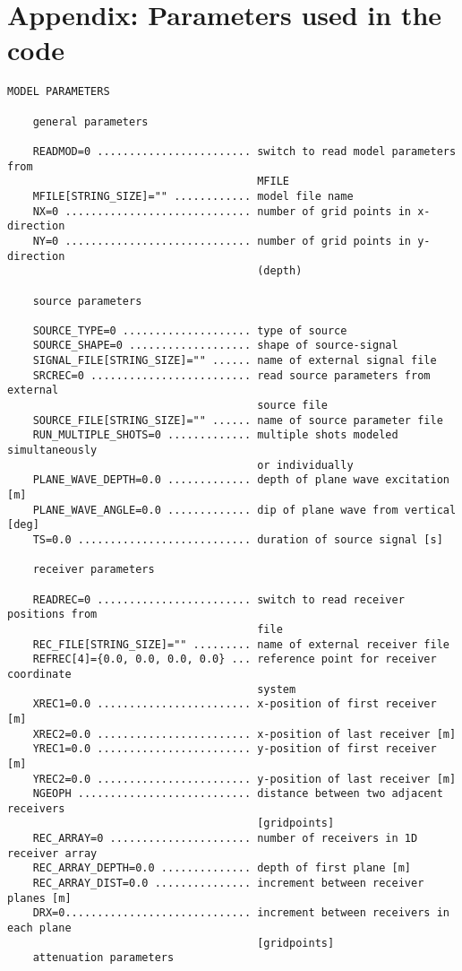 \section{Appendix: Parameters used in the code}
\label{parameters}

\begin{verbatim}
MODEL PARAMETERS
    
    general parameters
    
    READMOD=0 ........................ switch to read model parameters from
                                       MFILE
    MFILE[STRING_SIZE]="" ............ model file name
    NX=0 ............................. number of grid points in x-direction
    NY=0 ............................. number of grid points in y-direction
                                       (depth)
    
    source parameters
    
    SOURCE_TYPE=0 .................... type of source
    SOURCE_SHAPE=0 ................... shape of source-signal
    SIGNAL_FILE[STRING_SIZE]="" ...... name of external signal file
    SRCREC=0 ......................... read source parameters from external
                                       source file
    SOURCE_FILE[STRING_SIZE]="" ...... name of source parameter file
    RUN_MULTIPLE_SHOTS=0 ............. multiple shots modeled simultaneously
                                       or individually
    PLANE_WAVE_DEPTH=0.0 ............. depth of plane wave excitation [m]
    PLANE_WAVE_ANGLE=0.0 ............. dip of plane wave from vertical [deg]
    TS=0.0 ........................... duration of source signal [s]
    
    receiver parameters
    
    READREC=0 ........................ switch to read receiver positions from
                                       file
    REC_FILE[STRING_SIZE]="" ......... name of external receiver file
    REFREC[4]={0.0, 0.0, 0.0, 0.0} ... reference point for receiver coordinate 
                                       system
    XREC1=0.0 ........................ x-position of first receiver [m]
    XREC2=0.0 ........................ x-position of last receiver [m]
    YREC1=0.0 ........................ y-position of first receiver [m]
    YREC2=0.0 ........................ y-position of last receiver [m]
    NGEOPH ........................... distance between two adjacent receivers 
                                       [gridpoints]
    REC_ARRAY=0 ...................... number of receivers in 1D receiver array
    REC_ARRAY_DEPTH=0.0 .............. depth of first plane [m] 
    REC_ARRAY_DIST=0.0 ............... increment between receiver planes [m]
    DRX=0............................. increment between receivers in each plane 
                                       [gridpoints]
    attenuation parameters
    

\end{verbatim}
